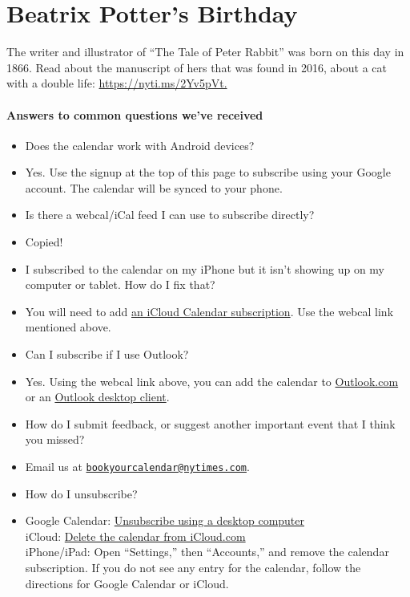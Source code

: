 \hypertarget{beatrix-potters-birthday-1}{%
\section{Beatrix Potter's Birthday}\label{beatrix-potters-birthday-1}}

The writer and illustrator of ``The Tale of Peter Rabbit'' was born on
this day in 1866. Read about the manuscript of hers that was found in
2016, about a cat with a double life:
\href{https://nyti.ms/2Yv5pVt?smid=bookscal}{https://nyti.ms/2Yv5pVt.}

\hypertarget{answers-to-common-questions-weve-received}{%
\paragraph{Answers to common questions we've
received}\label{answers-to-common-questions-weve-received}}

\begin{itemize}
\item
  Does the calendar work with Android devices?
\item
  Yes. Use the signup at the top of this page to subscribe using your
  Google account. The calendar will be synced to your phone.
\item
  Is there a webcal/iCal feed I can use to subscribe directly?
\item
  Copied!
\item
  I subscribed to the calendar on my iPhone but it isn't showing up on
  my computer or tablet. How do I fix that?
\item
  You will need to add
  \href{https://support.apple.com/en-us/HT202361}{an iCloud Calendar
  subscription}. Use the webcal link mentioned above.
\item
  Can I subscribe if I use Outlook?
\item
  Yes. Using the webcal link above, you can add the calendar to
  \href{https://support.office.com/en-us/article/Import-or-subscribe-to-a-calendar-in-Outlook-com-or-Outlook-on-the-web-cff1429c-5af6-41ec-a5b4-74f2c278e98c}{Outlook.com}
  or an
  \href{https://support.office.com/en-us/article/View-and-subscribe-to-Internet-Calendars-7CD5D35A-4A90-4D70-A2F7-F6FADD7E2D9A}{Outlook
  desktop client}.
\item
  How do I submit feedback, or suggest another important event that I
  think you missed?
\item
  Email us at
  \href{mailto:bookyourcalendar@nytimes.com}{\nolinkurl{bookyourcalendar@nytimes.com}}.
\item
  How do I unsubscribe?
\item
  Google Calendar:
  \href{https://support.google.com/calendar/answer/37188}{Unsubscribe
  using a desktop computer}\\
  iCloud: \href{https://support.apple.com/kb/PH2679?locale=en_US}{Delete
  the calendar from iCloud.com}\\
  iPhone/iPad: Open ``Settings,'' then ``Accounts,'' and remove the
  calendar subscription. If you do not see any entry for the calendar,
  follow the directions for Google Calendar or iCloud.
\end{itemize}

